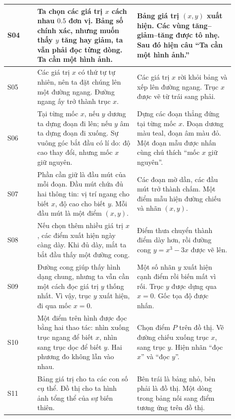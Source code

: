 \documentclass[11pt,a4paper]{article}
\begin{document}
\begin{longtable}{|L{0.12\linewidth}|L{0.40\linewidth}|L{0.39\linewidth}|}
S04 &
Ta chọn các giá trị \(x\) cách nhau \(0.5\) đơn vị. Bảng số chính xác, nhưng muốn thấy \(y\) tăng hay giảm, ta vẫn phải đọc từng dòng. Ta cần một hình ảnh. &
Bảng giá trị \((x,y)\) xuất hiện. Các vùng tăng--giảm--tăng được tô nhẹ. Sau đó hiện câu “Ta cần một hình ảnh.”\\
\hline

S05 &
Các giá trị \(x\) có thứ tự tự nhiên, nên ta đặt chúng lên một đường ngang. Đường ngang ấy trở thành trục \(x\). &
Các giá trị \(x\) rời khỏi bảng và xếp lên đường ngang. Trục \(x\) được vẽ từ trái sang phải.\\
\hline

S06 &
Tại từng mốc \(x\), nếu \(y\) dương ta dựng đoạn đi lên; nếu \(y\) âm ta dựng đoạn đi xuống. Sự vuông góc bắt đầu có lí do: độ cao thay đổi, nhưng mốc \(x\) giữ nguyên. &
Dựng các đoạn thẳng đứng tại từng mốc \(x\). Đoạn dương màu teal, đoạn âm màu đỏ. Một đoạn mẫu được nhấn cùng chú thích “mốc \(x\) giữ nguyên”.\\
\hline

S07 &
Phần cần giữ là đầu mút của mỗi đoạn. Đầu mút chứa đủ hai thông tin: vị trí ngang cho biết \(x\), độ cao cho biết \(y\). Mỗi đầu mút là một điểm \((x,y)\). &
Các đoạn mờ dần, các đầu mút trở thành chấm. Một điểm mẫu hiện đường chiếu và nhãn \((x,y)\).\\
\hline

S08 &
Nếu chọn thêm nhiều giá trị \(x\), các điểm xuất hiện ngày càng dày. Khi đủ dày, mắt ta bắt đầu thấy một đường cong. &
Điểm thưa chuyển thành điểm dày hơn, rồi đường cong \(y=x^3-3x\) được vẽ lên.\\
\hline

S09 &
Đường cong giúp thấy hình dạng chung, nhưng ta vẫn cần một cách đọc giá trị \(y\) thống nhất. Vì vậy, trục \(y\) xuất hiện, đi qua mốc \(x=0\). &
Một số nhãn \(y\) xuất hiện cạnh điểm rồi biến mất vì rối. Trục \(y\) được dựng qua \(x=0\). Gốc tọa độ được nhấn.\\
\hline

S10 &
Một điểm trên hình được đọc bằng hai thao tác: nhìn xuống trục ngang để biết \(x\), nhìn sang trục dọc để biết \(y\). Hai phương đo không lẫn vào nhau. &
Chọn điểm \(P\) trên đồ thị. Vẽ đường chiếu xuống trục \(x\), sang trục \(y\). Hiện nhãn “đọc \(x\)” và “đọc \(y\)”.\\
\hline

S11 &
Bảng giá trị cho ta các con số cụ thể. Đồ thị cho ta hình ảnh tổng thể của sự biến thiên. &
Bên trái là bảng nhỏ, bên phải là đồ thị. Một dòng trong bảng nối sang điểm tương ứng trên đồ thị.\\
\hline


\end{longtable}
\end{document}
